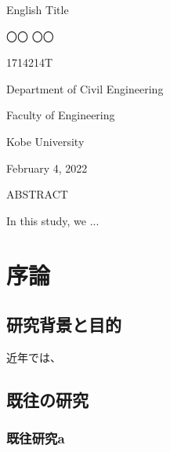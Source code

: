 \documentclass[12pt]{jsarticle}
\begin{document}
  \begin{center}
  \vspace*{50truept}
  
  \begin{spacing}{1.2}
    \LARGE English Title
  \end{spacing}
  
  \vspace{20truept}

  {\large 〇〇 〇〇}

  \vspace{10truept}

  {\large 1714214T}

  \vspace{10truept}
  
  {\large Department of Civil Engineering}

  \vspace{10truept}

  {\large Faculty of Engineering}

  \vspace{10truept}

  {\large Kobe University}

  \vspace{20truept}

  {\large February 4, 2022}

  \vspace{20truept}

  {\large ABSTRACT}
  
  \end{center}

  In this study, we ...

  \clearpage
  \tableofcontents
  \clearpage

  \section{序論}

  \subsection{研究背景と目的}

  近年では、

  \subsection{既往の研究}

  \subsubsection{既往研究a}
\end{document}
